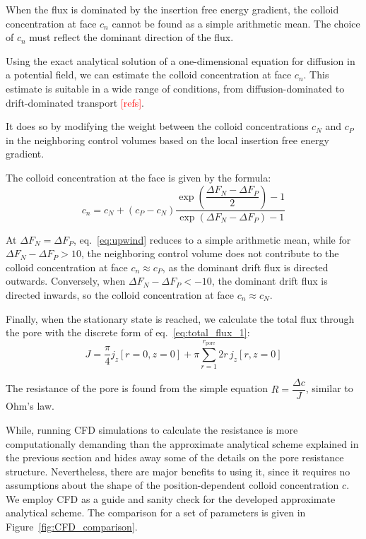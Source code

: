 \documentclass[10pt, a4paper]{article}
\newcommand\todo[1]{\textcolor{red}{#1}}
\begin{document}
\begin{multicols}{2}
When the flux is dominated by the insertion free energy gradient, the colloid concentration at face $c_n$ cannot be found as a simple arithmetic mean.
The choice of $c_n$ must reflect the dominant direction of the flux.

Using the exact analytical solution of a one-dimensional equation for diffusion in a potential field, we can estimate the colloid concentration at face $c_n$.
This estimate is suitable in a wide range of conditions, from diffusion-dominated to drift-dominated transport \todo{[refs]}.

It does so by modifying the weight between the colloid concentrations $c_N$ and $c_P$ in the neighboring control volumes based on the local insertion free energy gradient.

The colloid concentration at the face is given by the formula:
\begin{equation}
    \label{eq:upwind}
    c_n = c_N + (c_P - c_N) \frac{\exp\left( \dfrac{\Delta F_N - \Delta F_P}{2} \right) - 1}{\exp\left( \Delta F_N - \Delta F_P \right) - 1}
\end{equation}

At $\Delta F_N = \Delta F_P$, eq.~\ref{eq:upwind} reduces to a simple arithmetic mean, while for $\Delta F_N - \Delta F_P > 10$, the neighboring control volume does not contribute to the colloid concentration at face $c_n \approx c_P$, as the dominant drift flux is directed outwards.
Conversely, when $\Delta F_N - \Delta F_P < -10$, the dominant drift flux is directed inwards, so the colloid concentration at face $c_n \approx c_N$.




Finally, when the stationary state is reached, we calculate the total flux through the pore with the discrete form of eq.~\ref{eq:total_flux_1}:
\begin{equation}
    \label{eq:total_flux_2}
    J = \frac{\pi}{4} j_z[ r = 0, z = 0 ] + \pi \sum_{r = 1}^{r_\textrm{pore}} 2 r \, j_z[ r, z = 0 ]
\end{equation}

The resistance of the pore is found from the simple equation $R = \dfrac{\Delta c}{J}$, similar to Ohm's law.

While, running CFD simulations to calculate the resistance is more computationally demanding than the approximate analytical scheme explained in the previous section and hides away some of the details on the pore resistance structure.
Nevertheless, there are major benefits to using it, since it requires no assumptions about the shape of the position-dependent colloid concentration $c$.
We employ CFD as a guide and sanity check for the developed approximate analytical scheme.
The comparison for a set of parameters is given in Figure~\ref{fig:CFD_comparison}.


\end{multicols}
\end{document}
